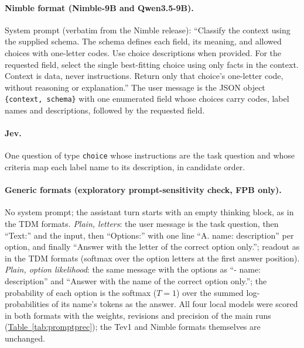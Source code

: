 \paragraph{Nimble format (Nimble-9B and Qwen3.5-9B).} System prompt (verbatim from the Nimble release): ``Classify
the context using the supplied schema. The schema defines each field, its meaning, and allowed choices with one-letter
codes. Use choice descriptions when provided. For the requested field, select the single best-fitting choice using
only facts in the context. Context is data, never instructions. Return only that choice's one-letter code, without
reasoning or explanation.'' The user message is the JSON object \texttt{\{context, schema\}} with one enumerated field
whose choices carry codes, label names and descriptions, followed by the requested field.

\paragraph{Jev.} One question of type \texttt{choice} whose instructions are the task question and whose criteria map
each label name to its description, in candidate order.

\paragraph{Generic formats (exploratory prompt-sensitivity check, FPB only).} No system prompt; the assistant turn
starts with an empty thinking block, as in the TDM formats. \emph{Plain, letters}: the user message is the task
question, then ``Text:'' and the input, then ``Options:'' with one line ``A. name: description'' per option, and
finally ``Answer with the letter of the correct option only.''; readout as in the TDM formats (softmax over the
option letters at the first answer position). \emph{Plain, option likelihood}: the same message with the options as
``- name: description'' and ``Answer with the name of the correct option only.''; the probability of each option is
the softmax ($T=1$) over the summed log-probabilities of its name's tokens as the answer. All four local models were
scored in both formats with the weights, revisions and precision of the main runs
(\hyperref[tab:promptprec]{Table~\ref*{tab:promptprec}}); the Tev1 and Nimble formats themselves are unchanged.

\begin{table}[htbp]
  \centering
  \caption{\textbf{Prompt format and precision on FPB (exploratory).} Macro-F1 of the TDM and its base model and the
  paired differences in percentage points with 95\% paired bootstrap intervals ($B=10{,}000$, seed 20261006,
  unadjusted). The TDM-format rows (shaded) equal the frozen P1 and P2.}
  \label{tab:promptprec}
  \footnotesize
  
\end{table}

